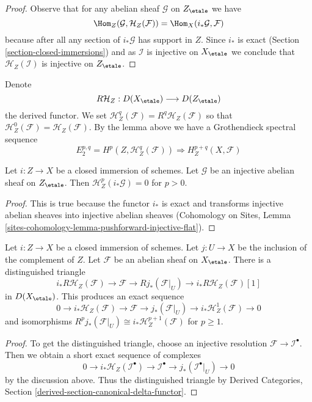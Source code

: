 \begin{proof}
Observe that for any abelian sheaf $\mathcal{G}$ on $Z_\etale$
we have
$$
\Hom_Z(\mathcal{G}, \mathcal{H}_Z(\mathcal{F})) =
\Hom_X(i_*\mathcal{G}, \mathcal{F})
$$
because after all any section of $i_*\mathcal{G}$ has support in $Z$.
Since $i_*$ is exact (Section \ref{section-closed-immersions}) and as
$\mathcal{I}$ is injective on $X_\etale$ we conclude that
$\mathcal{H}_Z(\mathcal{I})$ is injective on $Z_\etale$.
\end{proof}

\noindent
Denote
$$
R\mathcal{H}_Z : D(X_\etale) \longrightarrow D(Z_\etale)
$$
the derived functor. We set
$\mathcal{H}^q_Z(\mathcal{F}) = R^q\mathcal{H}_Z(\mathcal{F})$ so that
$\mathcal{H}^0_Z(\mathcal{F}) = \mathcal{H}_Z(\mathcal{F})$.
By the lemma above we have a Grothendieck spectral sequence
$$
E_2^{p, q} = H^p(Z, \mathcal{H}^q_Z(\mathcal{F}))
\Rightarrow H^{p + q}_Z(X, \mathcal{F})
$$

\begin{lemma}
\label{lemma-cohomology-with-support-sheaf-on-support}
Let $i : Z \to X$ be a closed immersion of schemes.
Let $\mathcal{G}$ be an injective abelian sheaf on $Z_\etale$.
Then $\mathcal{H}^p_Z(i_*\mathcal{G}) = 0$ for $p > 0$.
\end{lemma}

\begin{proof}
This is true because the functor $i_*$ is exact and transforms
injective abelian sheaves into injective abelian sheaves
(Cohomology on Sites, Lemma
\ref{sites-cohomology-lemma-pushforward-injective-flat}).
\end{proof}

\begin{lemma}
\label{lemma-cohomology-with-support-triangle}
Let $i : Z \to X$ be a closed immersion of schemes.
Let $j : U \to X$ be the inclusion of the complement of $Z$.
Let $\mathcal{F}$ be an abelian sheaf on $X_\etale$.
There is a distinguished triangle
$$
i_*R\mathcal{H}_Z(\mathcal{F}) \to \mathcal{F} \to Rj_*(\mathcal{F}|_U) \to
i_*R\mathcal{H}_Z(\mathcal{F})[1]
$$
in $D(X_\etale)$. This produces an exact sequence
$$
0 \to i_*\mathcal{H}_Z(\mathcal{F}) \to \mathcal{F} \to
j_*(\mathcal{F}|_U) \to i_*\mathcal{H}^1_Z(\mathcal{F}) \to 0
$$
and isomorphisms
$R^pj_*(\mathcal{F}|_U) \cong i_*\mathcal{H}^{p + 1}_Z(\mathcal{F})$
for $p \geq 1$.
\end{lemma}

\begin{proof}
To get the distinguished triangle, choose an injective resolution
$\mathcal{F} \to \mathcal{I}^\bullet$. Then we obtain a short exact
sequence of complexes
$$
0 \to
i_*\mathcal{H}_Z(\mathcal{I}^\bullet) \to \mathcal{I}^\bullet
\to j_*(\mathcal{I}^\bullet|_U) \to 0
$$
by the discussion above. Thus the distinguished triangle by
Derived Categories, Section \ref{derived-section-canonical-delta-functor}.
\end{proof}

